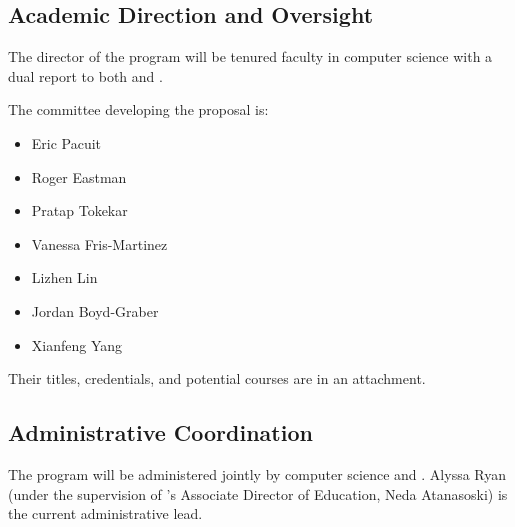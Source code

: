 
\subsection{Academic Direction and Oversight}

The director of the program will be tenured faculty in computer science with a dual report to both  and .

The committee developing the proposal is:
\begin{itemize}
    \item Eric Pacuit
    \item Roger Eastman
    \item Pratap Tokekar
    \item Vanessa Fris-Martinez
    \item Lizhen Lin
    \item Jordan Boyd-Graber
    \item Xianfeng Yang
\end{itemize}

Their titles, credentials, and potential courses are in an attachment.

\subsection{Administrative Coordination}

The program will be administered jointly by computer science and \aim{}.  Alyssa Ryan (under the supervision of \aim{}'s Associate Director of Education, Neda Atanasoski) is the current administrative lead.